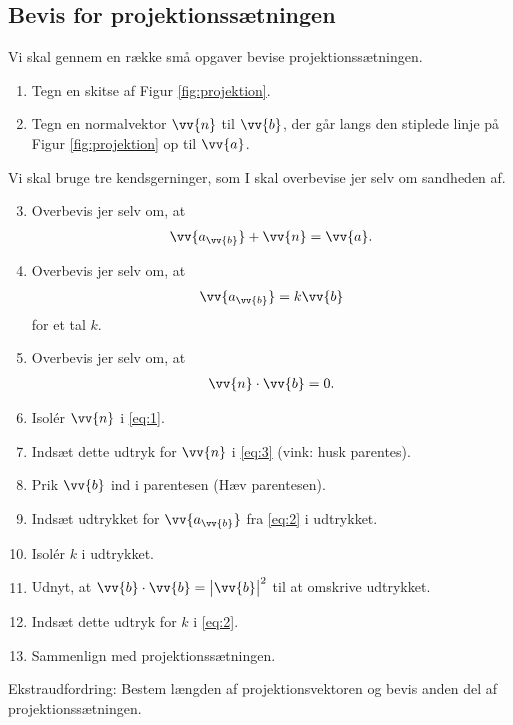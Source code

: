 \subsection*{Bevis for projektionssætningen}
Vi skal gennem en række små opgaver bevise projektionssætningen. 
\begin{enumerate}[label=\roman*)]
	\item Tegn en skitse af Figur \ref{fig:projektion}.
	\item Tegn en normalvektor $\vv{n}$ til $\vv{b}$, der går langs den stiplede linje på Figur \ref{fig:projektion} op til $\vv{a}$.
\end{enumerate}
Vi skal bruge tre kendsgerninger, som I skal overbevise jer selv om sandheden af.
\begin{enumerate}[label=\roman*)]
	\setcounter{enumi}{2}
	\item Overbevis jer selv om, at 
	\begin{align}\label{eq:1}
		\vv{a_{\vv{b}}} + \vv{n} = \vv{a}.
	\end{align}	 
	\item Overbevis jer selv om, at
	\begin{align}\label{eq:2}
		\vv{a_{\vv{b}}} = k \vv{b}
	\end{align}	  
	for et tal $k$. 
	\item Overbevis jer selv om, at
	\begin{align}\label{eq:3}
		\vv{n} \cdot \vv{b} = 0.
	\end{align}	
	\item Isolér $\vv{n}$ i \eqref{eq:1}.
	\item Indsæt dette udtryk for $\vv{n}$ i \eqref{eq:3} (vink: husk parentes).
	\item Prik $\vv{b}$ ind i parentesen (Hæv parentesen). 
	\item Indsæt udtrykket for $\vv{a_{\vv{b}}}$ fra \eqref{eq:2} i udtrykket.
	\item Isolér $k$ i udtrykket. 
	\item Udnyt, at $\vv{b}\cdot\vv{b} = \big|\vv{b}\big|^2$ til at omskrive udtrykket.
	\item Indsæt dette udtryk for $k$ i \eqref{eq:2}.
	\item Sammenlign med projektionssætningen.
\end{enumerate}

Ekstraudfordring: Bestem længden af projektionsvektoren og bevis anden del af projektionssætningen.

